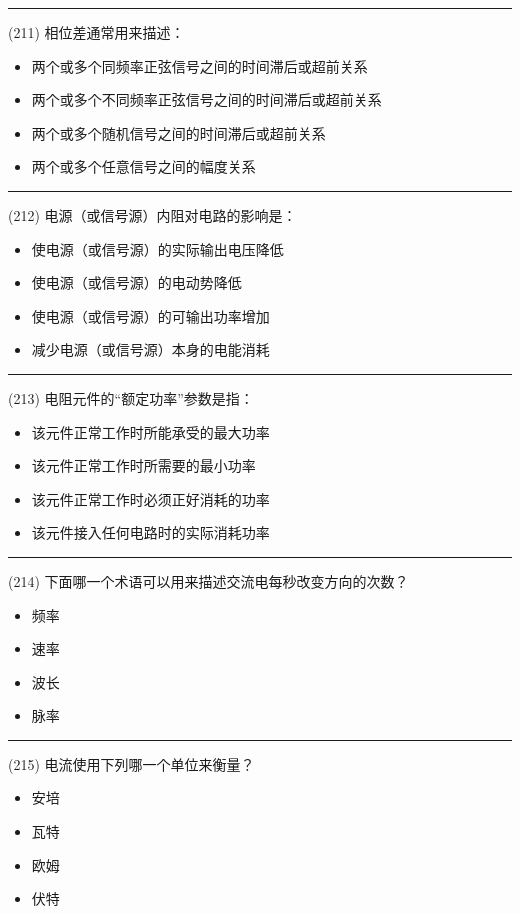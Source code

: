 \documentclass[twocolumn]{ctexart}  %
\begin{document}
\noindent\rule{0.5\textwidth}{1pt}
\heiti (211) 相位差通常用来描述： \songti {\color{gray} [LK0529] }
\begin{itemize}
	\item  两个或多个同频率正弦信号之间的时间滞后或超前关系
	\item  两个或多个不同频率正弦信号之间的时间滞后或超前关系
	\item  两个或多个随机信号之间的时间滞后或超前关系
	\item  两个或多个任意信号之间的幅度关系
\end{itemize}


\noindent\rule{0.5\textwidth}{1pt}
\heiti (212) 电源（或信号源）内阻对电路的影响是： \songti {\color{gray} [LK0537] }
\begin{itemize}
	\item  使电源（或信号源）的实际输出电压降低
	\item  使电源（或信号源）的电动势降低
	\item  使电源（或信号源）的可输出功率增加
	\item  减少电源（或信号源）本身的电能消耗
\end{itemize}


\noindent\rule{0.5\textwidth}{1pt}
\heiti (213) 电阻元件的“额定功率”参数是指： \songti {\color{gray} [LK0577] }
\begin{itemize}
	\item  该元件正常工作时所能承受的最大功率
	\item  该元件正常工作时所需要的最小功率
	\item  该元件正常工作时必须正好消耗的功率
	\item  该元件接入任何电路时的实际消耗功率
\end{itemize}


\noindent\rule{0.5\textwidth}{1pt}
\heiti (214) 下面哪一个术语可以用来描述交流电每秒改变方向的次数？ \songti {\color{gray} [LK1107] }
\begin{itemize}
	\item  频率
	\item  速率
	\item  波长
	\item  脉率
\end{itemize}


\noindent\rule{0.5\textwidth}{1pt}
\heiti (215) 电流使用下列哪一个单位来衡量？ \songti {\color{gray} [LK1134] }
\begin{itemize}
	\item  安培
	\item  瓦特
	\item  欧姆
	\item  伏特
\end{itemize}
\end{document}
